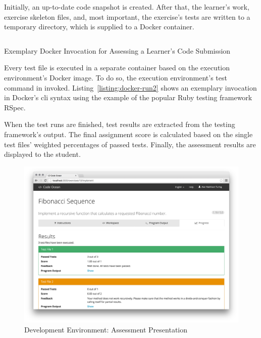 Initially, an up-to-date code snapshot is created. After that, the learner's work, exercise skeleton files, and, most important, the exercise's tests are written to a temporary directory, which is supplied to a Docker container.

\begin{listing}
\inputminted[frame=lines]{sh}{listings/docker-run2.sh}
\vspace{-0.33cm}
\caption{Exemplary Docker Invocation for Assessing a Learner’s Code Submission}
\label{listing:docker-run2}
\end{listing}

Every test file is executed in a separate container based on the execution environment's Docker image. To do so, the execution environment's test command in invoked. Listing~\ref{listing:docker-run2} shows an exemplary invocation in Docker's \gls{cli} syntax using the example of the popular Ruby testing framework RSpec.

When the test runs are finished, test results are extracted from the testing framework's output. The final assignment score is calculated based on the single test files' weighted percentages of passed tests. Finally, the assessment results are displayed to the student.

\begin{figure}
\centering
\includegraphics[width=\textwidth]{images/development-environment3.png}
\vspace{-1cm}
\caption{Development Environment: Assessment Presentation}
\label{figure:development-environment3}
\end{figure}

